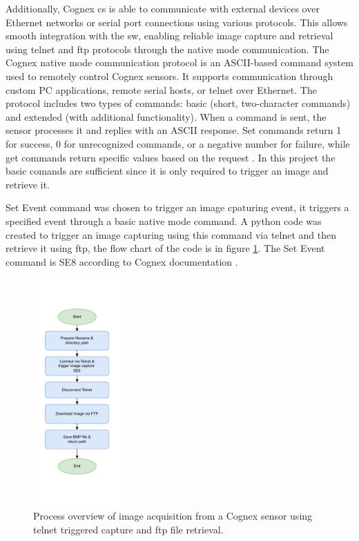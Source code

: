 Additionally, Cognex \gls{cs} is able to communicate with external devices over Ethernet networks or serial port connections using various protocols. This allows smooth integration with the \gls{sw}, enabling reliable image capture and retrieval using \gls{telnet} and \gls{ftp} protocols through the native mode communication. The Cognex native mode communication protocol is an ASCII-based command system used to remotely control Cognex sensors. It supports communication through custom PC applications, remote serial hosts, or \gls{telnet} over Ethernet. The protocol includes two types of commands: basic (short, two-character commands) and extended (with additional functionality). When a command is sent, the sensor processes it and replies with an ASCII response. Set commands return 1 for success, 0 for unrecognized commands, or a negative number for failure, while get commands return specific values based on the request \cite{Cognex_Com}. In this project the basic comands are sufficient since it is only required to trigger an image and retrieve it. 

Set Event command was chosen to trigger an image cpaturing event, it triggers a specified event through a basic native mode command. A python code was created to trigger an image capturing using this command via \gls{telnet} and then retrieve it using \gls{ftp}, the flow chart of the code is in figure \ref{Image_capture_code}. The Set Event command is SE8 according to Cognex documentation \cite{Cognex_Com}.

\begin{figure}[!htb]
    \centering
    \includegraphics[width=0.3\textwidth]{Figures/diagrams/Image_Capturing.pdf}
    \caption{Process overview of image acquisition from a Cognex sensor using \gls{telnet} triggered capture and \gls{ftp} file retrieval.}
    \label{Image_capture_code}
\end{figure}

